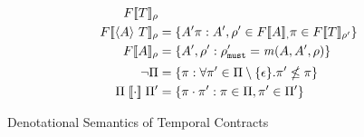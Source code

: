 {\begin{align*}
{        \denotetconfulle{\mtcon}{\menv}}
      \\
     \denotetconfulle{\stbind{\mevent}{\mtcon}}{\menv} &=
     \setbuild{\mevent' \mtrace}{\mevent',\menv' \in \denotetconfulle{\mevent}, \mtrace \in \denotetconfulle{\mtcon}{\menv'}}
     \\
      \denotetconfulle{\mevent}{\menv} &= \setbuild{\mevent',\menv'}{\menv'_\must =
        \matches(\mevent, \mevent', \menv)}
      \\[2pt]
      \semneg{\Pi} &= \setbuild{\mtrace}{\forall \mtrace' \in
        \Pi\setminus\setof{\epsilon}. \mtrace' \nleq \mtrace}
      \\
      \Pi \semseq \Pi' &= \setbuild{\mtrace \cdot \mtrace'}{\mtrace
        \in \Pi, \mtrace' \in \Pi'}
    \end{align*}}{\caption{Denotational Semantics of Temporal Contracts}\label{fig:tcontract-denotation}}
